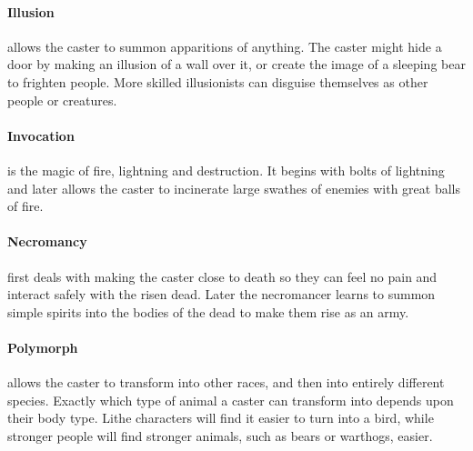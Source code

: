 \begin{multicols}{2}
\paragraph{Illusion} allows the caster to summon apparitions of anything. The caster might hide a door by making an illusion of a wall over it, or create the image of a sleeping bear to frighten people. More skilled illusionists can disguise themselves as other people or creatures.

\paragraph{Invocation} is the magic of fire, lightning and destruction. It begins with bolts of lightning and later allows the caster to incinerate large swathes of enemies with great balls of fire.

\paragraph{Necromancy} first deals with making the caster close to death so they can feel no pain and interact safely with the risen dead.
Later the necromancer learns to summon simple spirits into the bodies of the dead to make them rise as an army.

\paragraph{Polymorph} allows the caster to transform into other races, and then into entirely different species.
Exactly which type of animal a caster can transform into depends upon their body type.
Lithe characters will find it easier to turn into a bird, while stronger people will find stronger animals, such as bears or warthogs, easier.

\end{multicols}

\resumecontents[magic]


